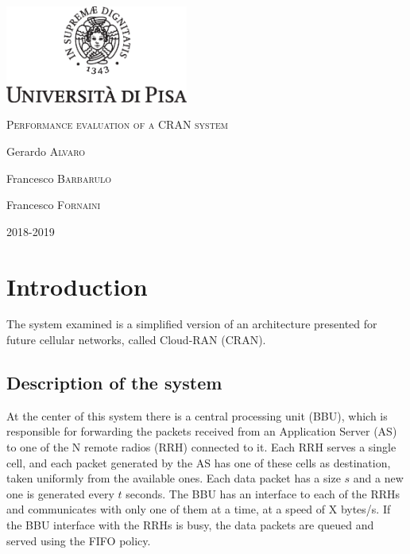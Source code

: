 \documentclass[11pt,a4paper,oneside, openright]{article}
\begin{document}
{
  \begin{titlepage}
  	\centering
  	\includegraphics[width=6cm]{images/unipi.eps}\par
  	\vspace{1.5cm}
  	{\huge\textsc{Performance evaluation of a CRAN system}\par}
  	\vspace{2cm}
  	Gerardo \textsc{Alvaro}\par
  	Francesco \textsc{Barbarulo}\par
    Francesco \textsc{Fornaini}

  	\vfill

  	{\large 2018-2019\par}
  \end{titlepage}
}


\tableofcontents

\newpage

\section{Introduction}
\label{sec:introduction}

The system examined is a simplified version of an architecture presented for future cellular networks, called Cloud-RAN (CRAN).

\subsection{Description of the system}
 At the center of this system there is a central processing unit (BBU), which is responsible for forwarding the packets received from an Application Server (AS) to one of the N remote radios (RRH) connected to it. Each RRH serves a single cell, and each packet generated by the AS has one of these cells as destination, taken uniformly from the available ones. Each data packet has a size $s$ and a new one is generated every $t$ seconds. The BBU has an interface to each of the RRHs and communicates with only one of them at a time, at a speed of X bytes/s. If the BBU interface with the RRHs is busy, the data packets are queued and served using the FIFO policy. 
\end{document}
